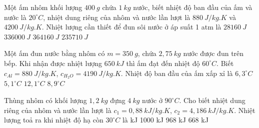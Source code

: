 \begin{ex} 
	Một ấm nhôm khối lượng $400 \ g$ chứa $1 \ kg$ nước, biết nhiệt độ ban đầu của ấm và nước là $20^\circ C$, nhiệt dung riêng của nhôm và nước lần lượt là $880\ J/kg. K$ và $4200 \ J/kg.K$. Nhiệt lượng cần thiết để đun sôi nước ở áp suất 1 atm là
	\choice
	{$28160 \ J$}
	{$336000 \ J$}
	{\True $364160 \ J$}
	{$235710 \ J$}
\end{ex}
\begin{ex}%
	Một ấm đun nước bằng nhôm có $m=350\ g$, chứa $2,75\ kg$ nước được đun trên bếp. Khi nhận được nhiệt lượng $650\ kJ$ thì ấm đạt đến nhiệt độ $60^{\circ}C$. Biết $c_{Al}=880\ J/kg.K$, $c_{H_2O}=4190\ J/kg.K$. Nhiệt độ ban đầu của ấm xấp xỉ là
	\choice
	{$6,3^{\circ}C$}
	{\True $5,1^{\circ}C$}
	{$12,1^{\circ}C$}
	{$8,9^{\circ}C$}
	\end{ex}



\begin{ex}
	Thùng nhôm có khối lượng $1,2 \ kg$ đựng $4 \ kg$ nước ở $90^\circ C$.  Cho biết nhiệt dung riêng của nhôm và nước lần lượt là $c_1=0,88 \ kJ / kg . K$, $c_2=4,186 \ kJ / kg . K$. Nhiệt lượng toả ra khi nhiệt độ hạ còn $30^\circ C$ là
	\choice
	{ kJ}
	{1000 kJ}
	{968 kJ}
	{668 kJ}
	\end{ex}


